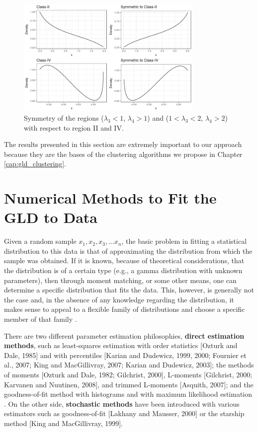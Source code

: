 \begin{figure}[H]
    \centering
    \includegraphics[width=0.8\textwidth]{img/gld/symetrics.png}
    \caption{Symmetry of the regions ($\lambda_{3}<1$, $\lambda_{4}>1$) and ($1<\lambda_{3}<2$, $\lambda_{4}>2$) with respect to  region II and IV.}
    \label{fig:symmetry}
\end{figure}

The results presented in this section are extremely important to our approach because they are the bases of the clustering algorithms we propose in Chapter \ref{cap:gld_clustering}.


\section{Numerical Methods to Fit the GLD to Data}\label{sec:gld_numerical_methods}
Given a random sample $x_{1},x_{2},x_{3},...x_{n}$, the basic problem in fitting a statistical distribution to this data is that of approximating the distribution from which the sample was obtained. If it is known, because of theoretical considerations, that the distribution is of a certain type (e.g., a gamma distribution with unknown parameters), then through moment matching, or some other means, one can determine a specific distribution that fits the data. This, however, is generally not the case and, in the absence of any knowledge regarding the distribution, it makes sense to appeal to a flexible family of distributions and choose a specific member of that family \cite{Karian2011}.

There are two different parameter estimation philosophies, \textbf{direct estimation methods}, such as least-squares estimation with order statistics [Ozturk and Dale, 1985] and with percentiles [Karian and Dudewicz, 1999, 2000; Fournier et al., 2007; King and MacGillivray, 2007; Karian and Dudewicz, 2003]; the methods of moments [Ozturk and Dale, 1982; Gilchrist, 2000], L-moments [Gilchrist, 2000; Karvanen and Nuutinen, 2008], and trimmed L-moments [Asquith, 2007]; and the goodness-of-fit method with histograms \cite{Su2005} and with maximum likelihood estimation \cite{Su2007}. On the other side, \textbf{stochastic methods} have been introduced with various estimators such as goodness-of-fit [Lakhany and Mausser, 2000] or the starship method [King and MacGillivray, 1999]. 


